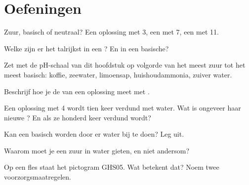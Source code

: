 \section{Oefeningen}

\begin{exercise}[$\star$]\label{exo:g9:acids-bases-ph:1}
Zuur, basisch of neutraal? Een oplossing met  3, een met  7, een met
 11.
\end{exercise}

\begin{exercise}[$\star$]\label{exo:g9:acids-bases-ph:2}
Welke  zijn er het talrijkst in een ? En in een
basische?
\end{exercise}

\begin{exercise}[$\star$]\label{exo:g9:acids-bases-ph:3}
Zet met de pH-schaal van dit hoofdstuk op volgorde van het meest zuur
tot het meest basisch: koffie, zeewater, limoensap, huishoudammonia,
zuiver water.
\end{exercise}

\begin{exercise}[$\star$]\label{exo:g9:acids-bases-ph:4}
Beschrijf hoe je de  van een oplossing meet met .
\end{exercise}

\begin{exercise}[$\star\star$]\label{exo:g9:acids-bases-ph:5}
Een oplossing met  4 wordt tien keer verdund met water. Wat is
ongeveer haar nieuwe ? En als ze honderd keer verdund wordt?
\end{exercise}

\begin{exercise}[$\star\star$]\label{exo:g9:acids-bases-ph:6}
Kan een  basisch worden door er water bij te doen? Leg
uit.
\end{exercise}

\begin{exercise}[$\star\star$]\label{exo:g9:acids-bases-ph:7}
Waarom moet je een zuur in water gieten, en niet andersom?
\end{exercise}

\begin{exercise}[$\star\star$]\label{exo:g9:acids-bases-ph:8}
Op een fles staat het pictogram GHS05. Wat betekent dat? Noem twee
voorzorgsmaatregelen.
\end{exercise}

